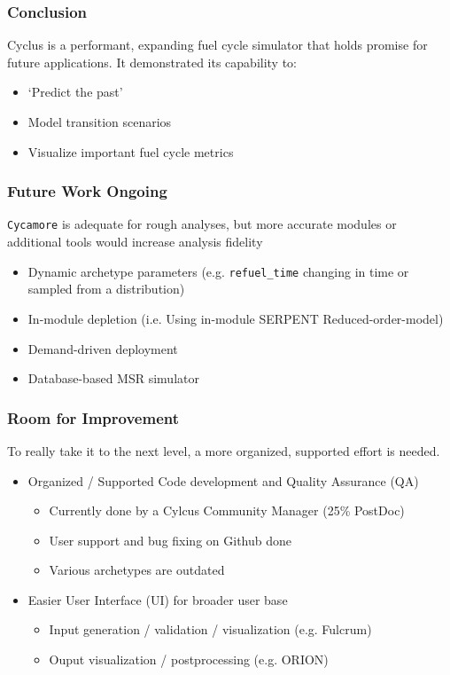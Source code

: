 \begin{frame}
    \frametitle{Conclusion}
    Cyclus is a performant, expanding fuel cycle simulator that holds promise for future applications. It demonstrated its capability to:
    \begin{itemize}
        \item `Predict the past'
        \item Model transition scenarios
        \item Visualize important fuel cycle metrics
    \end{itemize}
\end{frame}

\begin{frame}
    \frametitle{Future Work Ongoing}
    \texttt{Cycamore} is adequate for rough analyses, but more accurate
    modules or additional tools would increase analysis fidelity
    \begin{itemize}
        \item Dynamic archetype parameters (e.g. \texttt{refuel\_time}
                changing in time or sampled from a distribution)
        \item In-module depletion (i.e. Using in-module SERPENT Reduced-order-model)
        \item Demand-driven deployment \footnotemark
        \item Database-based MSR simulator
    \end{itemize}
\end{frame}


\begin{frame}
    \frametitle{Room for Improvement}
    To really take it to the next level, a more organized, supported
    effort is needed.
    \begin{itemize}
        \item Organized / Supported Code development and Quality Assurance (QA)
        \begin{itemize}
            \item Currently done by a Cylcus Community Manager (25\% PostDoc)
            \item User support and bug fixing on Github done
            \item Various archetypes are outdated
        \end{itemize}
        \item Easier User Interface (UI) for broader user base
        \begin{itemize}
            \item Input generation / validation / visualization (e.g. Fulcrum)
            \item Ouput visualization / postprocessing (e.g. ORION)
        \end{itemize}
    \end{itemize}
\end{frame}


